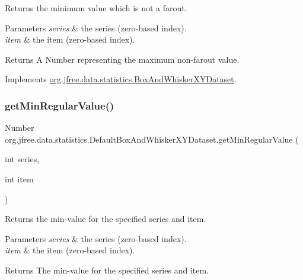 Returns the minimum value which is not a farout. 
\begin{DoxyParams}{Parameters}
{\em series} & the series (zero-\/based index). \\
\hline
{\em item} & the item (zero-\/based index).\\
\hline
\end{DoxyParams}
\begin{DoxyReturn}{Returns}
A {\ttfamily Number} representing the maximum non-\/farout value. 
\end{DoxyReturn}


Implements \mbox{\hyperlink{interfaceorg_1_1jfree_1_1data_1_1statistics_1_1_box_and_whisker_x_y_dataset_a3008c9b45ede75485f3f1f8d3443dda3}{org.\+jfree.\+data.\+statistics.\+Box\+And\+Whisker\+X\+Y\+Dataset}}.

\mbox{\label{classorg_1_1jfree_1_1data_1_1statistics_1_1_default_box_and_whisker_x_y_dataset_a7104c413a84e5908e40bfa42d931d965}} 
\subsubsection{\texorpdfstring{get\+Min\+Regular\+Value()}{getMinRegularValue()}}
{\footnotesize\ttfamily Number org.\+jfree.\+data.\+statistics.\+Default\+Box\+And\+Whisker\+X\+Y\+Dataset.\+get\+Min\+Regular\+Value (\begin{DoxyParamCaption}\item[{int}]{series,  }\item[{int}]{item }\end{DoxyParamCaption})}

Returns the min-\/value for the specified series and item.


\begin{DoxyParams}{Parameters}
{\em series} & the series (zero-\/based index). \\
\hline
{\em item} & the item (zero-\/based index).\\
\hline
\end{DoxyParams}
\begin{DoxyReturn}{Returns}
The min-\/value for the specified series and item. 
\end{DoxyReturn}


